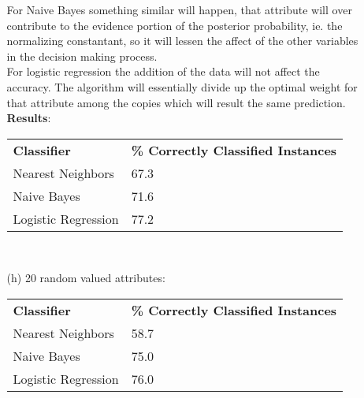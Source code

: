 \documentclass[12pt]{article}
\begin{document}
\begin{enumerate}
\begin{enumerate}
	 	For Naive Bayes something similar will happen, that attribute will over contribute to the evidence portion of the posterior probability, ie. the normalizing constantant, so it will lessen the affect of the other variables in the decision making process. \\
	    For logistic regression the addition of the data will not affect the accuracy. The algorithm will essentially divide up the optimal weight for that attribute among the copies which will result the same prediction. \\
	 	\textbf{Results}: \\
  		\begin{tabular}{l l}
  			\textbf{Classifier} & \textbf{\% Correctly Classified Instances} \\
  			Nearest Neighbors & 67.3 \\
  			Naive Bayes & 71.6 \\
  			Logistic Regression & 77.2
  		\end{tabular} \\
  		
	\item[(h)] 20 random valued attributes: \\
  		\begin{tabular}{l l}
  			\textbf{Classifier} & \textbf{\% Correctly Classified Instances} \\
  			Nearest Neighbors & 58.7 \\
  			Naive Bayes & 75.0 \\
  			Logistic Regression & 76.0
  		\end{tabular} \\
  	
  \end{enumerate}
  

\end{enumerate}
\end{document}
